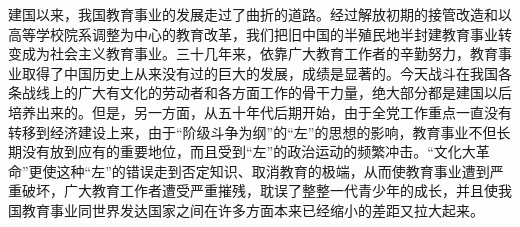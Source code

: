 \documentclass[12pt,a4paper]{article}
\begin{document}
建国以来，我国教育事业的发展走过了曲折的道路。经过解放初期的接管改造和以高等学校院系调整为中心的教育改革，我们把旧中国的半殖民地半封建教育事业转变成为社会主义教育事业。三十几年来，依靠广大教育工作者的辛勤努力，教育事业取得了中国历史上从来没有过的巨大的发展，成绩是显著的。今天战斗在我国各条战线上的广大有文化的劳动者和各方面工作的骨干力量，绝大部分都是建国以后培养出来的。但是，另一方面，从五十年代后期开始，由于全党工作重点一直没有转移到经济建设上来，由于“阶级斗争为纲”的“左”的思想的影响，教育事业不但长期没有放到应有的重要地位，而且受到“左”的政治运动的频繁冲击。“文化大革命”更使这种“左”的错误走到否定知识、取消教育的极端，从而使教育事业遭到严重破坏，广大教育工作者遭受严重摧残，耽误了整整一代青少年的成长，并且使我国教育事业同世界发达国家之间在许多方面本来已经缩小的差距又拉大起来。
\end{document}
